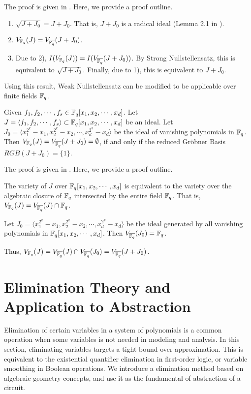 The proof is given in \cite{gao:gf-gb-ms}. Here, we provide a proof outline.

\begin{Proof}
\begin{enumerate}[{1)}]
\item $\sqrt{J+J_0} = J+J_0$. That is, $J+J_0$ is a radical ideal (Lemma 2.1 in \cite{gao:qe-gf-gb}).
\item $V_{{\mathbb{F}}_{q}}(J)=V_{\overline{{\mathbb{F}}_{q}}}(J+J_0)$.
\item Due to 2), $I(V_{{\mathbb{F}}_{q}}(J)) = I(V_{\overline{{\mathbb{F}}_{q}}}(J+J_0))$. 
By Strong Nullstellensatz, this is equivalent to $\sqrt{J+J_0}$.
Finally, due to 1), this is equivalent to $J+J_0$.
\end{enumerate}
\end{Proof}


Using this result, Weak Nullstellensatz can be 
modified to be applicable over finite fields ${\mathbb{F}}_{q}$.
\begin{Theorem}
\label{wnull:ff}
\cite{null:1890}
Given $f_1,f_2,\cdots,f_s \in {\mathbb{F}}_{q}[x_1,x_2,\cdots,x_d]$. 
Let $J=\langle f_1,f_2,\cdots,f_s\rangle \subset {\mathbb{F}}_{q}[x_1,
x_2, \cdots, x_d]$ be an ideal. Let $J_0 = \langle 
x_1^{2^k}-x_1,x_2^{2^k}-x_2,\cdots,x_d^{2^k}-x_d \rangle$ be the ideal
of vanishing polynomials in ${\mathbb{F}}_{q}$. Then
$V_{{\mathbb{F}}_{q}}(J) = V_{\overline {{\mathbb{F}}_{q}}}(J +
J_0)=\emptyset$,  if and only if the reduced
Gr\"obner Basis $RGB(J+J_{0})=\{1\}$. 
\end{Theorem}

The proof is given in \cite{null:1890}. Here, we provide a proof outline.

\begin{Proof}
The variety of $J$ over ${\mathbb{F}}_{q}[x_1,x_2,\cdots,x_d]$ 
is equivalent to the variety over the algebraic closure of ${\mathbb{F}}_{q}$ 
intersected by the entire field ${\mathbb{F}}_{q}$. That is, $V_{{\mathbb{F}}_{q}}(J)=V_{\overline 
{{\mathbb{F}}_{q}}}(J) \cap {\mathbb{F}}_{q}$. 

Let $J_0 = \langle 
x_1^{2^k}-x_1,x_2^{2^k}-x_2,\cdots,x_d^{2^k}-x_d \rangle$ be the ideal
generated by all vanishing polynomials in ${\mathbb{F}}_{q}[x_1,x_2,\cdots,x_d]$.
Then $V_{\overline{{\mathbb{F}}_{q}}}(J_0)={\mathbb{F}}_{q}$. 

Thus, $V_{{\mathbb{F}}_{q}}(J) = V_{\overline{{\mathbb{F}}_{q}}}(J)\cap V_{\overline{{\mathbb{F}}_{q}}}(J_0)
= V_{\overline{{\mathbb{F}}_{q}}}(J+J_0)$.
\end{Proof}


\section{Elimination Theory and Application to Abstraction}
\label{sec:abstraction}
Elimination of certain variables in a system of polynomials is a common 
operation when some variables is not needed in modeling and analysis. 
In this section, eliminating variables targets a tight-bound over-approximation.
This is equivalent to the existential quantifier elimination in first-order logic,
or variable smoothing in Boolean operations. We introduce a elimination method 
based on algebraic geometry concepts, and use it as the fundamental of 
abstraction of a circuit.

